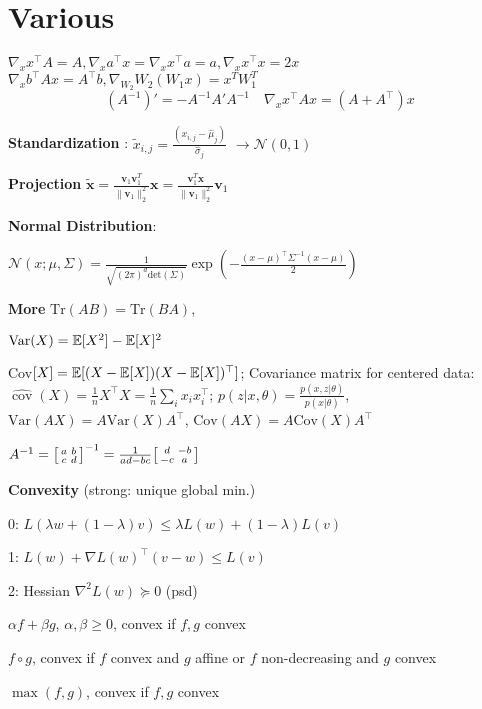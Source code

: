\\[-20pt]

\section*{Various}

$\nabla_x x^\top A = A ,\nabla_x a^\top x = \nabla_x x^\top a = a , \nabla_x x^\top x = 2x$
$\nabla_x b^\top A x = A^\top b , \nabla_{W_2} W_2(W_1 x) = x^T W_1^T $
$$(A^{-1})' = -A^{-1} A' A^{-1} \quad \nabla_x x^\top A x = (A + A^\top)x$$

\textbf{Standardization} : $\tilde{x}_{i,j} = \frac{(x_{i,j}-\hat{\mu}_j)}{\hat{\sigma}_j}$ $\rightarrow \mathcal{N}(0, 1)$

\textbf{Projection} $\tilde{\mathbf{x}} = \frac{\mathbf{v}_1 \mathbf{v}_1^T}{\|\mathbf{v}_1\|_2^2} \mathbf{x} = \frac{\mathbf{v}_1^T \mathbf{x}}{\|\mathbf{v}_1\|_2^2} \mathbf{v}_1$

\textbf{Normal Distribution}:

$\mathcal{N}(x; \mu, \Sigma) = \frac{1}{\sqrt{(2 \pi)^d \text{det}(\Sigma)}} \exp(-\frac{(x - \mu)^\top \Sigma^{-1} (x-\mu)}{2})$

\textbf{More} $\text{Tr}(AB) = \text{Tr}(BA)$, 

$\text{Var}(X) = \mathbb{E}[X^2] - \mathbb{E}[X]^2$
 
Cov$[X] = \mathbb{E}[(X- \mathbb{E}[X])(X- \mathbb{E}[X])^\top]$;
Covariance matrix for centered data: $
\widehat{\operatorname{cov}}(X)=\frac{1}{n}X^\top X=\frac{1}{n}\sum_i x_ix_i^\top
$; $p(z|x,\theta) = \frac{p(x,z|\theta)}{p(x | \theta)}$, $\text{Var}(AX) = A \text{Var}(X) A^\top$, $\text{Cov}(AX) = A \text{Cov}(X) A^\top$

$A^{-1}=
\begin{bsmallmatrix}
a&b \\ 
c&d
\end{bsmallmatrix}^{-1}=\frac{1}{ad-bc}
\begin{bsmallmatrix}
d&-b \\ 
-c&a
\end{bsmallmatrix}
$

\textbf{Convexity} (strong: unique global min.)

0: $L(\lambda w + (1 - \lambda)v) \leq \lambda L (w) + (1- \lambda) L(v)$

1: $L(w) + \nabla L(w)^\top (v - w) \leq L(v)$

2: Hessian $\nabla^2 L (w) \succcurlyeq 0$ (psd)

\begin{rowlist}
	\item $\alpha f + \beta g$, $\alpha, \beta \geq 0$, convex if $f, g$ convex
	\item $f \circ g$, convex if $f$ convex and $g$ affine or $f$ non-decreasing and $g$ convex
	\item $\max(f, g)$, convex if $f,g$ convex
\end{rowlist}

